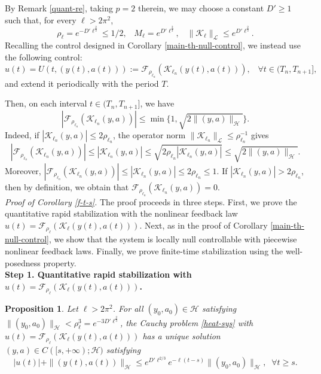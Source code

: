 \documentclass[a4paper]{article}
\newtheorem{proposition}[theorem]{Proposition}
\numberwithin{equation}{section}
\begin{document}
\begin{appendices}
By Remark \ref{quant-re}, taking $p=2$ therein, we may choose a constant $D'\ge 1$ such that, for every $\ell>2\pi^2$,
$$\rho_{\ell}=e^{-D'\ell^{\frac{2}{3}}}\le 1/2, \;\;\; M_{\ell}=e^{D'\ell^{\frac{2}{3}}},\;\;\; \|\mathcal K_{\ell}\|_{\mathcal L}\le e^{{D}'\ell^{\frac{2}{3}}}.$$ 
Recalling the control designed in Corollary \ref{main-th-null-control}, we instead use the following control:
\begin{equation}\label{c-2}
u(t)=U(t,(y(t),a(t))):=\mathcal{F}_{\rho_{\ell_n}}(\mathcal{K}_{\ell_n}(y(t),a(t))),\;\;\;\forall t\in (T_n,T_{n+1}],
\end{equation}
and extend it periodically with the period $T$.

Then, on each interval $t\in (T_n,T_{n+1}]$, we have
\begin{equation}\label{F-boun}
|\mathcal{F}_{\rho_{\ell_n}}(\mathcal{K}_{\ell_n}(y,a))|\le \min\{1,\sqrt{2\|(y,a)\|_{\mathcal{H}}}\}.
\end{equation}
Indeed, if $|\mathcal{K}_{\ell_n}(y,a)|\le 2\rho_{\ell_n}$, the operator norm $\|\mathcal{K}_{\ell_n}\|_{\mathcal{L}}\le \rho_{\ell_n}^{-1}$ gives
$$|\mathcal{F}_{\rho_{\ell_n}}(\mathcal{K}_{\ell_n}(y,a))|\le|\mathcal{K}_{\ell_n}(y,a)|\le \sqrt{2\rho_{\ell_n}|\mathcal{K}_{\ell_n}(y,a)|}\le\sqrt{2\|(y,a)\|_{\mathcal{H}}}.$$
Moreover,
$|\mathcal{F}_{\rho_{\ell_n}}(\mathcal{K}_{\ell_n}(y,a))|\le|\mathcal{K}_{\ell_n}(y,a)|\le {2\rho_{\ell_n}}\le 1$.
If $|\mathcal{K}_{\ell_n}(y,a)|> 2\rho_{\ell_n}$, then by definition, we obtain that $\mathcal{F}_{\rho_{\ell_n}}(\mathcal{K}_{\ell_n}(y,a))=0$. 
\\[-1mm]

\noindent \textit{Proof of Corollary \ref{f-t-s}.} The proof proceeds in three steps. First, we prove the quantitative rapid stabilization with the nonlinear feedback law $u(t)=\mathcal{F}_{\rho_{\ell}}(\mathcal{K}_{\ell}(y(t),a(t)))$. Next, as in the proof of Corollary \ref{main-th-null-control}, we show that the system is locally null controllable with piecewise nonlinear feedback laws. Finally, we prove finite-time stabilization using the well-posedness property.
\hfill \\[-2mm] 

\noindent \textbf{Step 1. Quantitative rapid stabilization with $u(t)=\mathcal{F}_{\rho_{\ell}}(\mathcal{K}_{\ell}(y(t),a(t)))$.}

\begin{proposition}\label{qu-ra-sta-ne}
Let $\ell>2\pi^2$. For all $(y_0,a_0)\in \mathcal{H}$ satisfying $\|(y_0,a_0)\|_{\mathcal{H}}<\rho_{\ell}^3=e^{-3D'{\ell}^{\frac{2}{3}}}$, the Cauchy problem \eqref{heat-sys} with $u(t)=\mathcal{F}_{\rho_{\ell}}(\mathcal{K}_{\ell}(y(t),a(t)))$
has a unique solution $(y,a)\in C([s,+\infty);\mathcal{H})$ satisfying 
\begin{equation}\label{exp-s-heat2}
|u(t)|+	\|(y(t),a(t))\|_{\mathcal{H}}\le e^{D'{\ell}^{2/3}}e^{-\ell (t-s)}\|(y_0,a_0)\|_{\mathcal{H}},\;\;\forall t\ge s.
\end{equation}
\end{proposition}


\end{appendices}
\end{document}
